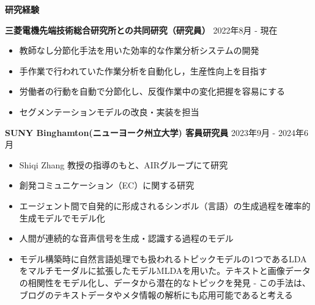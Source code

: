 \documentclass[a4paper,10pt]{article}
\begin{document}
\noindent
\begin{minipage}[t]{0.3\textwidth}
    \textbf{研究経験}
\end{minipage}%
\begin{minipage}[t]{0.7\textwidth}

     \textbf{三菱電機先端技術総合研究所との共同研究（研究員）} \hfill 2022年8月 - 現在 
\begin{itemize}
     \item 教師なし分節化手法を用いた効率的な作業分析システムの開発 
     \item 手作業で行われていた作業分析を自動化し，生産性向上を目指す 
     \item 労働者の行動を自動で分節化し、反復作業中の変化把握を容易にする
     \item セグメンテーションモデルの改良・実装を担当\newline
\end{itemize}

     \textbf{SUNY Binghamton(ニューヨーク州立大学) 客員研究員} \hfill 2023年9月 - 2024年6月 
\begin{itemize}
    \item Shiqi Zhang 教授の指導のもと、AIRグループにて研究
    \item 創発コミュニケーション（EC）に関する研究
    \item エージェント間で自発的に形成されるシンボル（言語）の生成過程を確率的生成モデルでモデル化
    \item 人間が連続的な音声信号を生成・認識する過程のモデル
    \item モデル構築時に自然言語処理でも扱われるトピックモデルの1つであるLDAをマルチモーダルに拡張したモデルMLDAを用いた。テキストと画像データの相関性をモデル化し、データから潜在的なトピックを発見 
    - この手法は、ブログのテキストデータやメタ情報の解析にも応用可能であると考える
\end{itemize}
\end{minipage}

\vspace{10pt}
\end{document}

